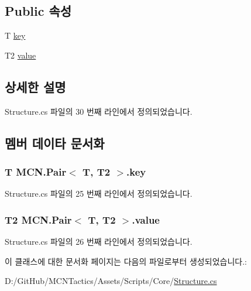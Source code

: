 \subsection*{Public 속성}
\begin{DoxyCompactItemize}
\item 
T \hyperlink{class_m_c_n_1_1_pair_a62c546d3829b8819a65f8c9d64200338}{key}
\item 
T2 \hyperlink{class_m_c_n_1_1_pair_a1980bbf37b60fcbfea22382f71250e84}{value}
\end{DoxyCompactItemize}


\subsection{상세한 설명}


Structure.\+cs 파일의 30 번째 라인에서 정의되었습니다.



\subsection{멤버 데이타 문서화}
\subsubsection[{\texorpdfstring{key}{key}}]{\setlength{\rightskip}{0pt plus 5cm}T {\bf M\+C\+N.\+Pair}$<$ T, T2 $>$.key\hspace{0.3cm}{\ttfamily [inherited]}}\hypertarget{class_m_c_n_1_1_pair_a62c546d3829b8819a65f8c9d64200338}{}\label{class_m_c_n_1_1_pair_a62c546d3829b8819a65f8c9d64200338}


Structure.\+cs 파일의 25 번째 라인에서 정의되었습니다.

\subsubsection[{\texorpdfstring{value}{value}}]{\setlength{\rightskip}{0pt plus 5cm}T2 {\bf M\+C\+N.\+Pair}$<$ T, T2 $>$.value\hspace{0.3cm}{\ttfamily [inherited]}}\hypertarget{class_m_c_n_1_1_pair_a1980bbf37b60fcbfea22382f71250e84}{}\label{class_m_c_n_1_1_pair_a1980bbf37b60fcbfea22382f71250e84}


Structure.\+cs 파일의 26 번째 라인에서 정의되었습니다.



이 클래스에 대한 문서화 페이지는 다음의 파일로부터 생성되었습니다.\+:\begin{DoxyCompactItemize}
\item 
D\+:/\+Git\+Hub/\+M\+C\+N\+Tactics/\+Assets/\+Scripts/\+Core/\hyperlink{_structure_8cs}{Structure.\+cs}\end{DoxyCompactItemize}
